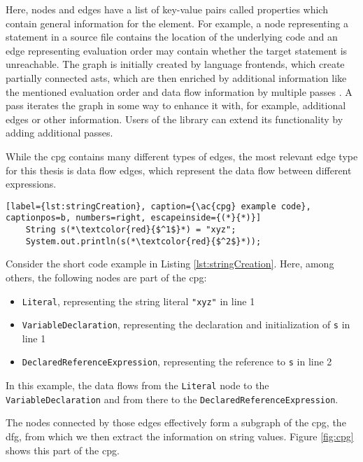 Here, nodes and edges have a list of key-value pairs called properties which contain general information for the element. For example, a node representing a statement in a source file contains the location of the underlying code and an edge representing evaluation order may contain whether the target statement is unreachable. The graph is initially created by language frontends, which create partially connected \acp{ast}, which are then enriched by additional information like the mentioned evaluation order and data flow information by multiple passes \cite{cpg}. A pass iterates the graph in some way to enhance it with, for example, additional edges or other information.
Users of the library can extend its functionality by adding additional passes.

While the \ac{cpg} contains many different types of edges, the most relevant edge type for this thesis is data flow edges, which represent the data flow between different expressions.

\begin{lstlisting}[label={lst:stringCreation}, caption={\ac{cpg} example code}, captionpos=b, numbers=right, escapeinside={(*}{*)}]
	String s(*\textcolor{red}{$^1$}*) = "xyz";
	System.out.println(s(*\textcolor{red}{$^2$}*));
\end{lstlisting}

Consider the short code example in Listing \ref{lst:stringCreation}. Here, among others, the following nodes are part of the \ac{cpg}:

\begin{itemize}
	\item \lstinline|Literal|, representing the string literal \lstinline{"xyz"} in line 1
	\item \lstinline|VariableDeclaration|, representing the declaration and initialization of \lstinline|s| in line 1
	\item \lstinline|DeclaredReferenceExpression|, representing the reference to \lstinline|s| in line 2
\end{itemize}

In this example, the data flows from the \lstinline|Literal| node to the \lstinline|VariableDeclaration| and from there to the \lstinline|DeclaredReferenceExpression|.

The nodes connected by those edges effectively form a subgraph of the \ac{cpg}, the \ac{dfg}, from which we then extract the information on string values. Figure \ref{fig:cpg} shows this part of the \ac{cpg}. 

